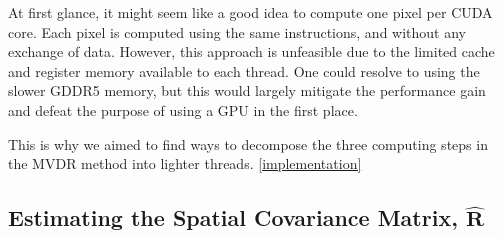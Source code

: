 \documentclass[12pt,journal,captionsoff,onecolumn]{IEEEtran}
\newcommand\1{\vec 1}
\begin{document}
% 
% 
% 
% 
% 




At first glance, it might seem like a good idea to compute one pixel per CUDA core. Each pixel is computed using the same instructions, and without any exchange of data. However, this approach is unfeasible due to the limited cache and register memory available to each thread. One could resolve to using the slower GDDR5 memory, but this would largely mitigate the performance gain and defeat the purpose of using a GPU in the first place.

This is why we aimed to find ways to decompose the three computing steps in the MVDR method into lighter threads. \ref{implementation}


% 



\subsection{Estimating the Spatial Covariance Matrix, $\hat{\boldsymbol{R}}$}
\end{document}
